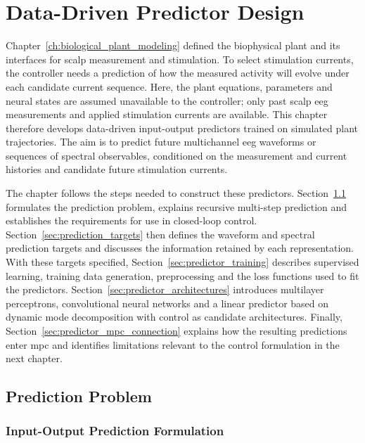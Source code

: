 
\chapter{Data-Driven Predictor Design}
\label{ch:data_driven_predictor_design}

Chapter~\ref{ch:biological_plant_modeling} defined the biophysical plant and its interfaces for scalp measurement and stimulation.
To select stimulation currents, the controller needs a prediction of how the measured activity will evolve under each candidate current sequence.
Here, the plant equations, parameters and neural states are assumed unavailable to the controller; only past scalp \ac{eeg} measurements and applied stimulation currents are available.
This chapter therefore develops data-driven input-output predictors trained on simulated plant trajectories.
The aim is to predict future multichannel \ac{eeg} waveforms or sequences of spectral observables, conditioned on the measurement and current histories and candidate future stimulation currents.

The chapter follows the steps needed to construct these predictors.
Section~\ref{sec:prediction_problem} formulates the prediction problem, explains recursive multi-step prediction and establishes the requirements for use in closed-loop control.
Section~\ref{sec:prediction_targets} then defines the waveform and spectral prediction targets and discusses the information retained by each representation.
With these targets specified, Section~\ref{sec:predictor_training} describes supervised learning, training data generation, preprocessing and the loss functions used to fit the predictors.
Section~\ref{sec:predictor_architectures} introduces multilayer perceptrons, convolutional neural networks and a linear predictor based on dynamic mode decomposition with control as candidate architectures.
Finally, Section~\ref{sec:predictor_mpc_connection} explains how the resulting predictions enter \ac{mpc} and identifies limitations relevant to the control formulation in the next chapter.


\section{Prediction Problem}
\label{sec:prediction_problem}

\subsection{Input-Output Prediction Formulation}

